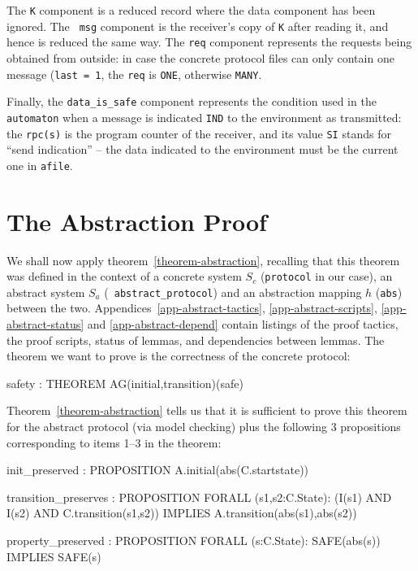 The {\tt K} component is a
reduced record  where the data component  has been  ignored.  The {\tt
msg} component is the receiver's copy of {\tt K} after reading it, and
hence is reduced the same way.  The {\tt req} component represents the
requests being obtained from outside:  in  case the concrete  protocol
files can only contain one message ({\tt last  = 1}, the {\tt req} is
{\tt  ONE},  otherwise {\tt   MANY}.

Finally, the {\tt  data\_is\_safe} component represents  the condition
used in the  {\tt automaton} when a message  is indicated {\tt IND} to
the environment   as  transmitted: the {\tt  rpc(s)}   is  the program
counter of the   receiver, and its value {\tt   SI} stands  for  ``send
indication'' --  the  data indicated  to  the environment  must  be the
current one in {\tt afile}.


\section{The Abstraction Proof}

We shall  now apply theorem~\ref{theorem-abstraction}, recalling that
this  theorem was defined  in the context  of  a concrete system $S_c$
({\tt  protocol}   in  our  case),  an  abstract  system   $S_a$ ({\tt
abstract\_protocol})  and  an  abstraction  mapping  $h$  ({\tt  abs})
between    the  two.   Appendices~\ref{app-abstract-tactics},    
\ref{app-abstract-scripts}, \ref{app-abstract-status} and 
\ref{app-abstract-depend}  contain  listings of the  proof tactics, 
the proof scripts, status of lemmas,  and dependencies between lemmas.
The   theorem we want to   prove  is the  correctness  of the concrete
protocol:

\begin{smallsession}
  safety : THEOREM
    AG(initial,transition)(safe)
\end{smallsession}

Theorem~\ref{theorem-abstraction} tells   us that it is sufficient  to
prove this theorem for the abstract protocol (via model checking) plus
the following 3 propositions corresponding to items 1--3 in the theorem:

\begin{smallsession}
  init_preserved : PROPOSITION
    A.initial(abs(C.startstate))

  transition_preserves : PROPOSITION
    FORALL (s1,s2:C.State):
      (I(s1) AND I(s2) AND C.transition(s1,s2))
        IMPLIES  
      A.transition(abs(s1),abs(s2))                      

  property_preserved : PROPOSITION
    FORALL (s:C.State): SAFE(abs(s)) IMPLIES SAFE(s)
\end{smallsession} 

